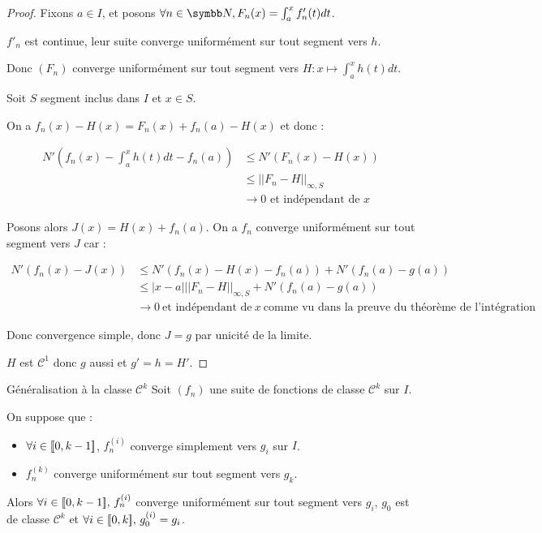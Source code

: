 \begin{proof}
    Fixons $a \in I$, et posons $\forall n \in \N, F_n(x) = \int_{a}^{x } f_n'(t) dt$.

    $f'_n$ est continue, leur suite converge uniformément sur tout segment vers $h$. 

    Donc $(F_n)$ converge uniformément sur tout segment vers $H : x \mapsto \int_a^x h(t) dt$.

    \avspace Soit $S$ segment inclus dans $I$ et $x \in S$. 
    
    On a $f_n(x) - H(x) = F_n(x) + f_n(a) - H(x)$ et donc :

    \begin{align*}
        N'(f_n(x) - \int_{a }^{x } h(t) dt - f_n(a)) & \leqslant N'(F_n(x) - H(x)) \\
        & \leqslant ||F_n - H||_{\infty, S} \\
        & \to 0 \text{ et indépendant de } x
    \end{align*}

    Posons alors $J(x) = H(x) + f_n(a)$. On a $f_n$ converge uniformément sur tout segment vers 
    $J$ car :
    
    \begin{align*}
        N'(f_n(x) - J(x)) & \leqslant N'(f_n(x) - H(x) - f_n(a)) + N'(f_n(a) - g(a)) \\
        & \leqslant |x - a| ||F_n - H||_{\infty, S} + N'(f_n(a) - g(a)) \\
        & \to 0 ~ \text{et indépendant de} ~ x ~ \text{comme vu dans la preuve du théorème de l'intégration}
    \end{align*}

    Donc convergence simple, donc $J = g$ par unicité de la limite. 

    $H$ est $\mathscr {C}^1$ donc $g$ aussi et $g' = h = H'$.
\end{proof}

\begin{theoreme}{Généralisation à la classe $\mathscr{C}^k$}{}
    Soit $(f_n)$ une suite de fonctions de classe $\mathscr{C}^k$ sur $I$. 

    On suppose que :
    \begin{itemize}
        \item $\forall i \in [\![0, k - 1]\!]$,
        $f_n^{(i)}$ converge simplement vers $g_i$ sur $I$.
        \item $f_n^{(k)}$ converge uniformément sur tout segment vers $g_k$.
    \end{itemize}

    Alors $\forall i \in [\![0, k - 1]\!], \, f_n^{(i)}$ converge uniformément sur tout segment vers $g_i$,
    $g_0$ est de classe $\mathscr{C}^k$ et $\forall i \in [\![0, k]\!], \, g_0^{(i)} = g_i$.
\end{theoreme}

